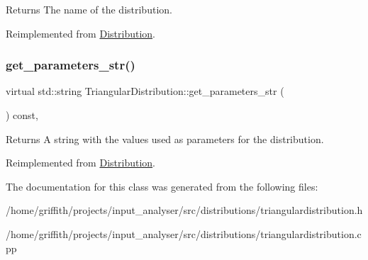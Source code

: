\begin{DoxyReturn}{Returns}
The name of the distribution. 
\end{DoxyReturn}


Reimplemented from \hyperlink{classDistribution_a478a0c7b72d3ad266a2b6f1b9ed20fe9}{Distribution}.

\mbox{\label{classTriangularDistribution_af54199e88d5c537fe621ae177b86a9d6}} 
\subsubsection{\texorpdfstring{get\+\_\+parameters\+\_\+str()}{get\_parameters\_str()}}
{\footnotesize\ttfamily virtual std\+::string Triangular\+Distribution\+::get\+\_\+parameters\+\_\+str (\begin{DoxyParamCaption}{ }\end{DoxyParamCaption}) const\hspace{0.3cm}{\ttfamily [inline]}, {\ttfamily [virtual]}}

\begin{DoxyReturn}{Returns}
A string with the values used as parameters for the distribution. 
\end{DoxyReturn}


Reimplemented from \hyperlink{classDistribution_a716b7df9facb6bb016f46ac130297f9c}{Distribution}.



The documentation for this class was generated from the following files\+:\begin{DoxyCompactItemize}
\item 
/home/griffith/projects/input\+\_\+analyser/src/distributions/triangulardistribution.\+h\item 
/home/griffith/projects/input\+\_\+analyser/src/distributions/triangulardistribution.\+cpp\end{DoxyCompactItemize}
